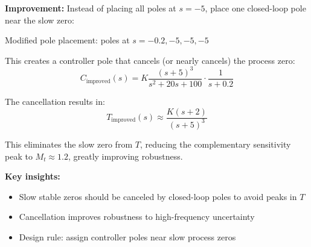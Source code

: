 \documentclass[11pt,a4paper]{article}
\begin{document}
\textbf{Improvement:}
Instead of placing all poles at $s = -5$, place one closed-loop pole near the slow zero:

Modified pole placement: poles at $s = -0.2, -5, -5, -5$

This creates a controller pole that cancels (or nearly cancels) the process zero:
\begin{equation}
  C_{\text{improved}}(s) = K\frac{(s + 5)^3}{s^2 + 20s + 100} \cdot \frac{1}{s + 0.2}
\end{equation}

The cancellation results in:
\begin{equation}
  T_{\text{improved}}(s) \approx \frac{K(s + 2)}{(s+5)^3}
\end{equation}

This eliminates the slow zero from $T$, reducing the complementary sensitivity peak to $M_t \approx 1.2$, greatly improving robustness.

\textbf{Key insights:}
\begin{itemize}
  \item Slow stable zeros should be canceled by closed-loop poles to avoid peaks in $T$
  \item Cancellation improves robustness to high-frequency uncertainty
  \item Design rule: assign controller poles near slow process zeros
\end{itemize}
\end{document}
